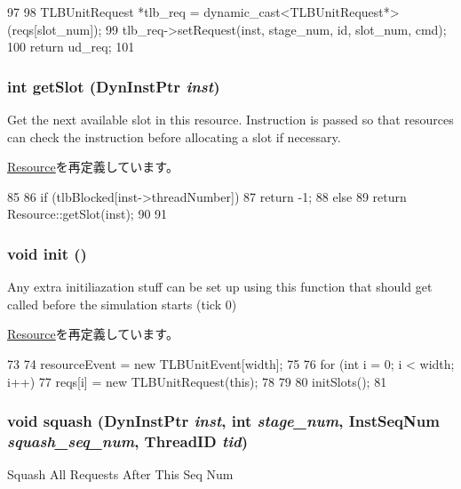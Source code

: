 \begin{DoxyCode}
97 {
98     TLBUnitRequest *tlb_req = dynamic_cast<TLBUnitRequest*>(reqs[slot_num]);
99     tlb_req->setRequest(inst, stage_num, id, slot_num, cmd);
100     return ud_req;
101 }
\end{DoxyCode}
\hypertarget{classTLBUnit_ab3ba2ee95c723c8c056db0a1f2a6dfd3}{
\subsubsection[{getSlot}]{\setlength{\rightskip}{0pt plus 5cm}int getSlot ({\bf DynInstPtr} {\em inst})}}
\label{classTLBUnit_ab3ba2ee95c723c8c056db0a1f2a6dfd3}
Get the next available slot in this resource. Instruction is passed so that resources can check the instruction before allocating a slot if necessary. 

\hyperlink{classResource_ab3ba2ee95c723c8c056db0a1f2a6dfd3}{Resource}を再定義しています。


\begin{DoxyCode}
85 {
86     if (tlbBlocked[inst->threadNumber]) {
87         return -1;
88     } else {
89         return Resource::getSlot(inst);
90     }
91 }
\end{DoxyCode}
\hypertarget{classTLBUnit_a02fd73d861ef2e4aabb38c0c9ff82947}{
\subsubsection[{init}]{\setlength{\rightskip}{0pt plus 5cm}void init ()}}
\label{classTLBUnit_a02fd73d861ef2e4aabb38c0c9ff82947}
Any extra initiliazation stuff can be set up using this function that should get called before the simulation starts (tick 0) 

\hyperlink{classResource_a02fd73d861ef2e4aabb38c0c9ff82947}{Resource}を再定義しています。


\begin{DoxyCode}
73 {
74     resourceEvent = new TLBUnitEvent[width];
75 
76     for (int i = 0; i < width; i++) {
77         reqs[i] = new TLBUnitRequest(this);
78     }
79 
80     initSlots();
81 }
\end{DoxyCode}
\hypertarget{classTLBUnit_a52235c5e3d912452f254dc45f1496fd2}{
\subsubsection[{squash}]{\setlength{\rightskip}{0pt plus 5cm}void squash ({\bf DynInstPtr} {\em inst}, \/  int {\em stage\_\-num}, \/  {\bf InstSeqNum} {\em squash\_\-seq\_\-num}, \/  {\bf ThreadID} {\em tid})}}
\label{classTLBUnit_a52235c5e3d912452f254dc45f1496fd2}
Squash All Requests After This Seq Num 

